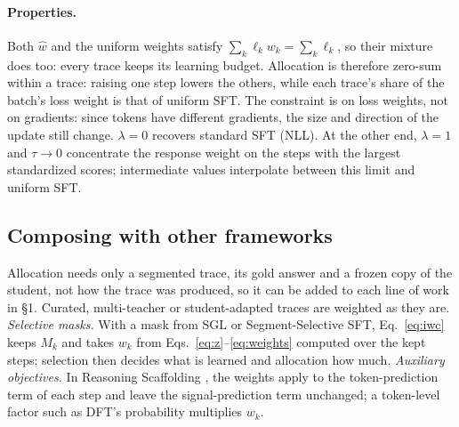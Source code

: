 \paragraph{Properties.}
Both $\hat w$ and the uniform weights satisfy $\sum_k\ell_k w_k=\sum_k\ell_k$, so their mixture does too: every trace keeps its learning budget.
Allocation is therefore zero-sum within a trace: raising one step lowers the others, while each trace's share of the batch's loss weight is that of uniform SFT.
The constraint is on loss weights, not on gradients: since tokens have different gradients, the size and direction of the update still change.
$\lambda=0$ recovers standard SFT (NLL).
At the other end, $\lambda=1$ and $\tau\to0$ concentrate the response weight on the steps with the largest standardized scores; intermediate values interpolate between this limit and uniform SFT.

\subsection{Composing with other frameworks}
\label{sec:compose}

Allocation needs only a segmented trace, its gold answer and a frozen copy of the student, not how the trace was produced, so it can be added to each line of work in \S1.
Curated, multi-teacher or student-adapted traces \citep{muennighoff2025s1,yun2026cord,liu2026palign} are weighted as they are.
\emph{Selective masks.} With a mask from SGL or Segment-Selective SFT, Eq.~\ref{eq:iwc} keeps $M_k$ and takes $w_k$ from Eqs.~\ref{eq:z}--\ref{eq:weights} computed over the kept steps; selection then decides what is learned and allocation how much.
\emph{Auxiliary objectives.} In Reasoning Scaffolding \citep{wen2026scaffolding}, the weights apply to the token-prediction term of each step and leave the signal-prediction term unchanged; a token-level factor such as DFT's probability multiplies $w_k$.
